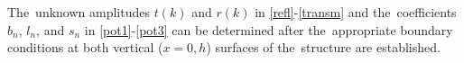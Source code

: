 The~unknown amplitudes $t(k)$ and $r(k)$ in \cref{refl}-\cref{transm} and the~coefficients $b_n$, $l_n$, and $s_n$ in \cref{pot1}-\cref{pot3} can be determined after the~appropriate boundary conditions at both vertical ($x=0,h$) surfaces of the~structure are established.



